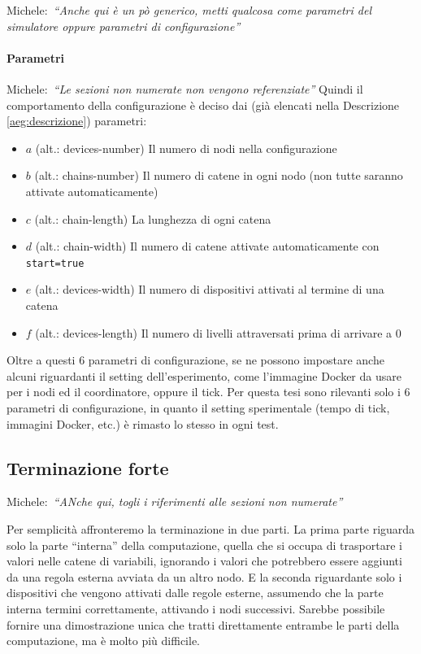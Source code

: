 \documentclass[12pt, a4paper]{article}
\newcommand{\michele}[1]{{\color{red}Michele:~}{\itshape``{#1}''}}
\begin{document}
\michele{Anche qui è un pò generico, metti qualcosa come parametri del simulatore oppure parametri di configurazione}

\paragraph{Parametri}

\michele{Le sezioni non numerate non vengono referenziate}
Quindi il comportamento della configurazione è deciso dai (già elencati nella Descrizione \ref{aeg:descrizione}) parametri:
\begin{itemize}
    \item $a$ (alt.: devices-number) Il numero di nodi nella configurazione
    \item $b$ (alt.: chains-number) Il numero di catene in ogni nodo (non tutte saranno attivate automaticamente)
    \item $c$ (alt.: chain-length) La lunghezza di ogni catena
    \item $d$ (alt.: chain-width) Il numero di catene attivate automaticamente con \lstinline{start=true}
    \item $e$ (alt.: devices-width) Il numero di dispositivi attivati al termine di una catena
    \item $f$ (alt.: devices-length) Il numero di livelli attraversati prima di arrivare a $0$
\end{itemize}

Oltre a questi 6 parametri di configurazione, se ne possono impostare anche alcuni riguardanti il setting dell'esperimento, come l'immagine Docker da usare per i nodi ed il coordinatore, oppure il tick.
Per questa tesi sono rilevanti solo i 6 parametri di configurazione, in quanto il setting sperimentale (tempo di tick, immagini Docker, etc.) è rimasto lo stesso in ogni test.

\subsection{Terminazione forte}

\michele{ANche qui, togli i riferimenti alle sezioni non numerate}

Per semplicità affronteremo la terminazione in due parti. La prima parte riguarda solo la parte ``interna'' della computazione, quella che si occupa di trasportare i valori nelle catene di variabili, ignorando i valori che potrebbero essere aggiunti da una regola esterna avviata da un altro nodo\label{terminazione:premesse:interna}.
E la seconda riguardante solo i dispositivi che vengono attivati dalle regole esterne, assumendo che la parte interna termini correttamente, attivando i nodi successivi\label{terminazione:premesse:esterna}.
Sarebbe possibile fornire una dimostrazione unica che tratti direttamente entrambe le parti della computazione, ma è molto più difficile.
\end{document}
